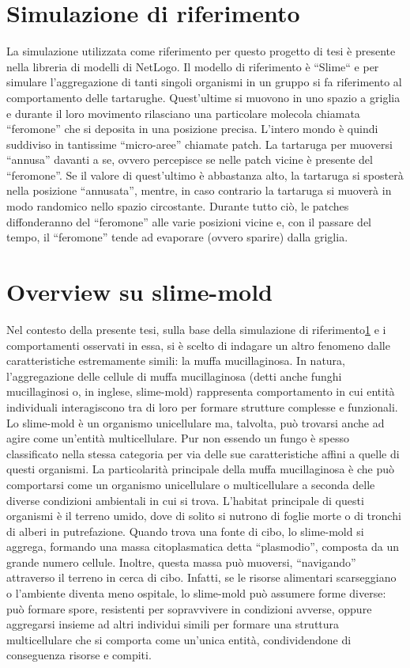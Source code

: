 \documentclass[12pt,a4paper,openright,twoside]{book}
\begin{document}
\section{Simulazione di riferimento}\label{refSim}
La simulazione utilizzata come riferimento per questo progetto di tesi è presente nella libreria
di modelli di NetLogo\space\cite{wilensky1997netlogo}. Il modello di riferimento è ``Slime``\space\cite{wilensky1997netlogo}
e per simulare l'aggregazione di tanti singoli organismi in un gruppo si fa riferimento al comportamento delle tartarughe.
Quest'ultime si muovono in uno spazio a griglia e durante il loro movimento rilasciano una particolare molecola
chiamata ``feromone'' che si deposita in una posizione precisa. L'intero mondo è quindi suddiviso
in tantissime ``micro-aree'' chiamate patch. La tartaruga per muoversi 
``annusa'' davanti a se, ovvero percepisce se nelle patch vicine è presente del ``feromone''. Se il valore di quest'ultimo è abbastanza alto, la 
tartaruga si sposterà nella posizione ``annusata'', mentre, in caso contrario la tartaruga si muoverà in modo randomico nello spazio circostante. 
Durante tutto ciò, le patches diffonderanno del ``feromone'' alle varie posizioni vicine e, con il passare del tempo,
il ``feromone'' tende ad evaporare (ovvero sparire) dalla griglia.

\section{Overview su slime-mold}
Nel contesto della presente tesi, sulla base della simulazione di riferimento\ref{refSim} e i comportamenti osservati in essa, si è scelto di indagare un altro 
fenomeno dalle caratteristiche estremamente simili: la muffa mucillaginosa.
In natura, l'aggregazione delle cellule di muffa mucillaginosa (detti anche funghi mucillaginosi o, in inglese, slime-mold) rappresenta
comportamento in cui entità individuali interagiscono tra di loro per formare strutture complesse e funzionali. 
Lo slime-mold è un organismo unicellulare ma, talvolta, può trovarsi anche ad agire come un'entità multicellulare. 
Pur non essendo un fungo è spesso classificato nella stessa categoria per via delle sue caratteristiche affini a quelle di questi organismi.
La particolarità principale della muffa mucillaginosa è che può comportarsi come un organismo unicellulare o multicellulare a seconda delle diverse 
condizioni ambientali in cui si trova.
L'habitat principale di questi organismi è il terreno umido, dove di solito si nutrono di foglie morte o di tronchi di alberi in putrefazione.
Quando trova una fonte di cibo, lo slime-mold si aggrega, formando una massa citoplasmatica detta ``plasmodio'', composta da un grande numero cellule. Inoltre,
questa massa può muoversi, ``navigando'' attraverso il terreno in cerca di cibo.
Infatti, se le risorse alimentari scarseggiano o l'ambiente diventa meno ospitale, lo slime-mold può assumere forme diverse: può formare spore, 
resistenti per sopravvivere in condizioni avverse, oppure aggregarsi insieme ad altri individui simili per formare una struttura multicellulare
che si comporta come un'unica entità, condividendone di conseguenza risorse e compiti.
\end{document}
